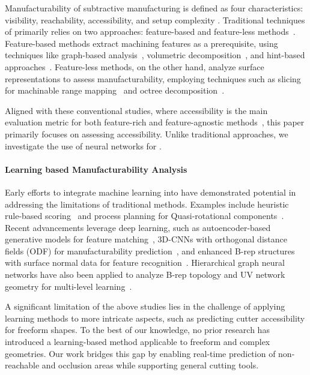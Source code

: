 Manufacturability of subtractive manufacturing is defined as four characteristics: visibility, reachability, accessibility, and setup complexity \cite{gupta1997automated, hoefer2017automated}.
%
Traditional techniques of \manuAna primarily relies on two approaches: feature-based and feature-less methods~\cite{zhang2020manufacturability}. Feature-based methods extract machining features as a prerequisite, using techniques like graph-based analysis~\cite{joshi1988graph}, volumetric decomposition~\cite{kailash2001volume,kim1990convex}, and hint-based approaches~\cite{regli1995geometric}. Feature-less methods, on the other hand, analyze surface representations to assess manufacturability, employing techniques such as slicing for machinable range mapping~\cite{li2006machinability} and octree decomposition~\cite{kerbrat2011new}.



Aligned with these conventional studies, where accessibility is the main evaluation metric for both feature-rich and feature-agnostic methods~\cite{zhang2020manufacturability}, this paper primarily focuses on assessing accessibility.
Unlike traditional approaches, we investigate the use of neural networks for \accessAna. 


\paragraph{Learning based Manufacturability Analysis}

Early efforts to integrate machine learning into \manuAna have demonstrated potential in addressing the limitations of traditional methods. Examples include heuristic rule-based scoring~\cite{kerbrat2011new,joshi2017geometric} and process planning for Quasi-rotational components~\cite{chen2020manufacturability}. Recent advancements leverage deep learning, such as autoencoder-based generative models for feature matching~\cite{yan2023automated}, 3D-CNNs with orthogonal distance fields (ODF) for manufacturability prediction~\cite{balu2020orthogonal}, and enhanced B-rep structures with surface normal data for feature recognition~\cite{ghadai2018learning}. Hierarchical graph neural networks have also been applied to analyze B-rep topology and UV network geometry for multi-level learning~\cite{huang5065158hierarchical}.


A significant limitation of the above studies lies in the challenge of applying learning methods to more intricate aspects, such as predicting cutter accessibility for freeform shapes.
To the best of our knowledge, no prior research has introduced a learning-based \accessAna method applicable to freeform and complex geometries. Our work bridges this gap by enabling real-time prediction of non-reachable and occlusion areas while supporting general cutting tools.


